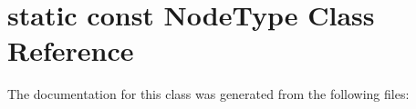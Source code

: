 \hypertarget{classstatic_01const_01NodeType}{}\section{static const Node\+Type Class Reference}
\label{classstatic_01const_01NodeType}


The documentation for this class was generated from the following files\+: